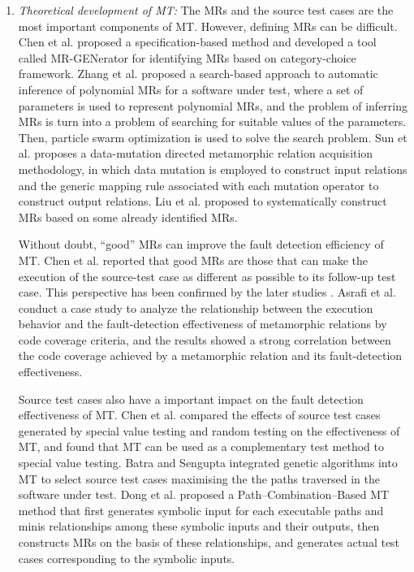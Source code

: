 \documentclass[conference]{IEEEtran}
\theoremstyle{remark}
\begin{document}
\begin{enumerate}[1]
  \item
  \emph{Theoretical development of MT:} The MRs and the source test cases are the most important components of MT. However, defining MRs can be difficult. Chen et al. \cite{chen2016metric} proposed a specification-based method and developed a tool called MR-GENerator for identifying MRs based on category-choice framework\cite{ostrand1988category}.
  Zhang et al. \cite{zhang2014search} proposed a search-based approach to automatic inference of polynomial MRs for a software under test, where a set of parameters is used to represent polynomial MRs, and the problem of inferring MRs is turn into a problem of searching for suitable values of the parameters. Then, particle swarm optimization is used to solve the search problem.
  Sun et al. \cite{sun2016mumt} proposes a data-mutation directed metamorphic relation acquisition methodology, in which data mutation is employed to construct input relations and the generic mapping rule associated with each mutation operator to construct output relations.
  Liu et al. \cite{liu2012new} proposed to systematically construct MRs based on some already identified MRs.

  Without doubt, ``good'' MRs can improve the fault detection efficiency of MT.
  Chen et al. \cite{chen2004case} reported that good MRs are those that can make the execution of the source-test case as different as possible to its follow-up test case.
  This perspective has been confirmed by the later studies \cite{dong2013security, batra2011efficient}.
  Asrafi et al. \cite{asrafi2011testing} conduct a case study to analyze the relationship between the execution behavior and the fault-detection effectiveness of metamorphic relations by code coverage criteria, and the results showed a strong correlation between the code coverage achieved by a metamorphic relation and its fault-detection effectiveness.

  Source test cases also have a important impact on the fault detection effectiveness of MT.
  Chen et al. \cite{chen2004metamorphic} compared the effects of source test cases generated by special value testing and random testing on the effectiveness of MT, and found that MT can be used as a complementary test method to special value testing.
  Batra and  Sengupta \cite{batra2011efficient} integrated genetic algorithms into MT to select source test cases maximising the the paths traversed in the software under test.
  Dong et al. \cite{dong2013security} proposed a Path--Combination--Based MT method that first generates symbolic input for each executable paths and minis relationships among these symbolic inputs and their outputs, then constructs MRs on the basis of these relationships, and generates actual test cases corresponding to the symbolic inputs.


\end{enumerate}
\end{document}
